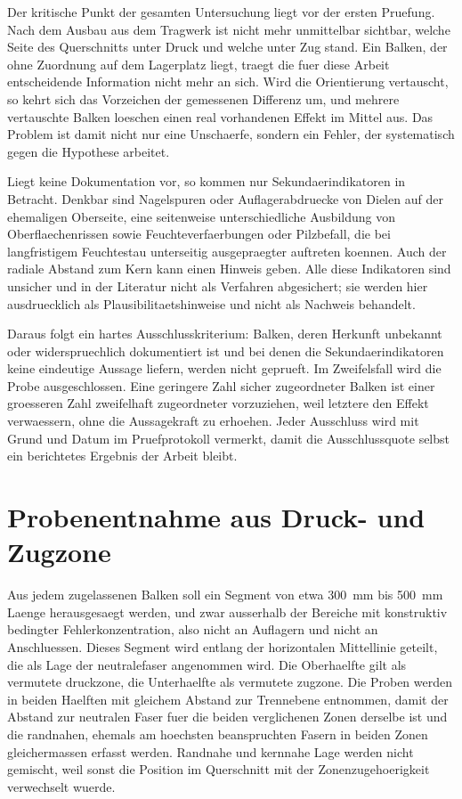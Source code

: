 Der kritische Punkt der gesamten Untersuchung liegt vor der ersten Pruefung.
Nach dem Ausbau aus dem Tragwerk ist nicht mehr unmittelbar sichtbar, welche
Seite des Querschnitts unter Druck und welche unter Zug stand. Ein Balken,
der ohne Zuordnung auf dem Lagerplatz liegt, traegt die fuer diese Arbeit
entscheidende Information nicht mehr an sich. Wird die Orientierung
vertauscht, so kehrt sich das Vorzeichen der gemessenen Differenz um, und
mehrere vertauschte Balken loeschen einen real vorhandenen Effekt im Mittel
aus. Das Problem ist damit nicht nur eine Unschaerfe, sondern ein Fehler, der
systematisch gegen die Hypothese arbeitet.

Liegt keine Dokumentation vor, so kommen nur Sekundaerindikatoren in Betracht.
Denkbar sind Nagelspuren oder Auflagerabdruecke von Dielen auf der ehemaligen
Oberseite, eine seitenweise unterschiedliche Ausbildung von Oberflaechenrissen
sowie Feuchteverfaerbungen oder Pilzbefall, die bei langfristigem Feuchtestau
unterseitig ausgepraegter auftreten koennen. Auch der radiale Abstand zum Kern
kann einen Hinweis geben. Alle diese Indikatoren sind unsicher und in der
Literatur nicht als Verfahren abgesichert; sie werden hier ausdruecklich als
Plausibilitaetshinweise und nicht als Nachweis behandelt.

Daraus folgt ein hartes Ausschlusskriterium: Balken, deren Herkunft unbekannt
oder widerspruechlich dokumentiert ist und bei denen die Sekundaerindikatoren
keine eindeutige Aussage liefern, werden nicht geprueft. Im Zweifelsfall wird
die Probe ausgeschlossen. Eine geringere Zahl sicher zugeordneter Balken ist
einer groesseren Zahl zweifelhaft zugeordneter vorzuziehen, weil letztere den
Effekt verwaessern, ohne die Aussagekraft zu erhoehen. Jeder Ausschluss wird
mit Grund und Datum im Pruefprotokoll vermerkt, damit die Ausschlussquote
selbst ein berichtetes Ergebnis der Arbeit bleibt.

\section{Probenentnahme aus Druck- und Zugzone}
\label{sec:probenentnahme}

Aus jedem zugelassenen Balken soll ein Segment von etwa \SI{300}{\milli\metre}
bis \SI{500}{\milli\metre} Laenge herausgesaegt werden, und zwar ausserhalb der
Bereiche mit konstruktiv bedingter Fehlerkonzentration, also nicht an
Auflagern und nicht an Anschluessen. Dieses Segment wird entlang der
horizontalen Mittellinie geteilt, die als Lage der \gls{neutralefaser}
angenommen wird. Die Oberhaelfte gilt als vermutete \gls{druckzone}, die
Unterhaelfte als vermutete \gls{zugzone}. Die Proben werden in beiden Haelften
mit gleichem Abstand zur Trennebene entnommen, damit der Abstand zur neutralen
Faser fuer die beiden verglichenen Zonen derselbe ist und die randnahen,
ehemals am hoechsten beanspruchten Fasern in beiden Zonen gleichermassen
erfasst werden. Randnahe und kernnahe Lage werden nicht gemischt, weil sonst
die Position im Querschnitt mit der Zonenzugehoerigkeit verwechselt wuerde.

